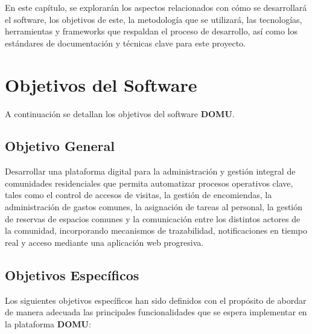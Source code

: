 En este capítulo, se explorarán los aspectos relacionados con cómo se desarrollará el software, los objetivos de este, la metodología que se utilizará, las tecnologías, herramientas y frameworks que respaldan el proceso de desarrollo, así como los estándares de documentación y técnicas clave para este proyecto.

\section{Objetivos del Software}
A continuación se detallan los objetivos del software \textbf{DOMU}.

\subsection{Objetivo General}
Desarrollar una plataforma digital para la administración y gestión integral de comunidades residenciales que permita automatizar procesos operativos clave, tales como el control de accesos de visitas, la gestión de encomiendas, la administración de gastos comunes, la asignación de tareas al personal, la gestión de reservas de espacios comunes y la comunicación entre los distintos actores de la comunidad, incorporando mecanismos de trazabilidad, notificaciones en tiempo real y acceso mediante una aplicación web progresiva.

\subsection{Objetivos Específicos}

Los siguientes objetivos específicos han sido definidos con el propósito de abordar de manera adecuada las principales funcionalidades que se espera implementar en la plataforma \textbf{DOMU}:

